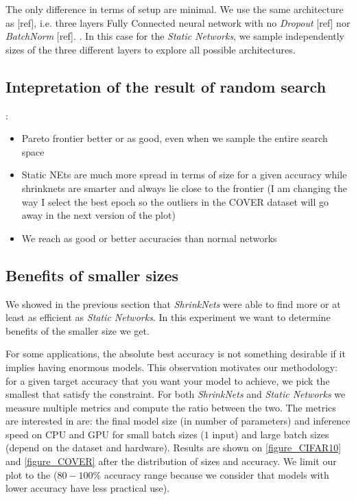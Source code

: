 The only difference in terms of setup are minimal. We use the same architecture
as [ref], i.e. three layers Fully Connected neural network with  no
\textit{Dropout} [ref] nor \textit{BatchNorm} [ref]. . In this case for the \textit{Static Networks}, we sample
independently sizes of the three different layers to explore all possible
architectures.


\subsection{Intepretation of the result of random search}

:
\begin{itemize}
  \item Pareto frontier better or as good, even when we sample the entire search
    space
  \item Static NEts are much more spread in terms of size for a given accuracy
    while shrinknets are smarter and always lie close to the frontier (I am
    changing the way I select the best epoch so the outliers in the COVER
    dataset will go away in the next version of the plot)
  \item We reach as good or better accuracies than normal networks
\end{itemize}


\subsection{Benefits of smaller sizes}

We showed in the previous section that \textit{ShrinkNets} were able to find
more or at least as efficient as \textit{Static Networks}. In this experiment we
want to determine benefits of the smaller size we get.

For some applications, the absolute best accuracy is not something desirable if
it implies having enormous models. This observation motivates our methodology:
for a given target accuracy that you want your model to achieve, we pick the
smallest that satisfy the constraint. For both \textit{ShrinkNets} and
\textit{Static Networks} we measure multiple metrics and compute the ratio
between the two. The metrics are interested in are: the final model size (in
number of parameters) and inference speed on CPU and GPU for small batch sizes
($1$ input) and large batch sizes (depend on the dataset and hardware). Results
are shown on \cref{figure_CIFAR10} and \cref{figure_COVER} after the
distribution of sizes and accuracy. We limit our plot to the ($80-100\%$
accuracy range because we consider that models with lower accuracy have less
practical use).


